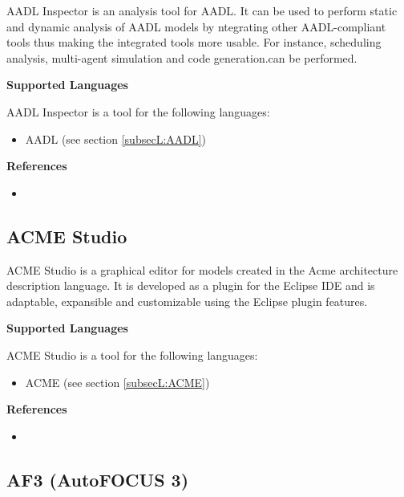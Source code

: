 AADL Inspector is an analysis tool for AADL. It can be used to perform static and dynamic analysis of AADL models by ntegrating other AADL-compliant tools thus making the integrated tools more usable. For instance, scheduling analysis, multi-agent simulation and code generation.can be performed.

\textbf{Supported Languages}

AADL Inspector is a tool for the following languages:
\begin{itemize}
	\item AADL (see section \ref{subsecL:AADL})
\end{itemize}


\textbf{References}
\begin{itemize}
	
\item {}
\end{itemize}



\subsection{ACME Studio}
\label{subsecT:AcmeStudio}


ACME Studio is a graphical editor for models created in the Acme architecture description language. It is developed as a plugin for the Eclipse IDE and is adaptable, expansible and customizable using the Eclipse plugin features.

\textbf{Supported Languages}

ACME Studio is a tool for the following languages:
\begin{itemize}
	\item ACME (see section \ref{subsecL:ACME})
\end{itemize}


\textbf{References}
\begin{itemize}
	
\item {}
\end{itemize}



\subsection{AF3 (AutoFOCUS 3)}
\label{subsecT:AF3}


